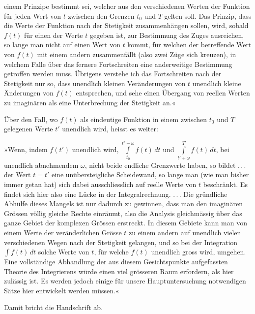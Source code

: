 \HistoricalFoot{}{26\textsuperscript{*}}
\clearpage{}
\noindent einem Prinzipe bestimmt sei, welcher aus den verschiedenen Werten der Funktion
für jeden Wert von \(t\) zwischen den Grenzen \(t_0\) und \(T\) gelten soll. Das
Prinzip, dass die Werte der Funktion nach der Stetigkeit zusammenhängen
sollen, wird, sobald \(f(t)\) für einen der Werte \(t\) gegeben ist, zur Bestimmung des
Zuges ausreichen, so lange man nicht auf einen Wert von \(t\) kommt, für
welchen der betreffende Wert von \(f(t)\) mit einem andern zusammenfällt (also
zwei Züge sich kreuzen), in welchem Falle über das fernere Fortschreiten eine
anderweitige Bestimmung getroffen werden muss. Übrigens verstehe ich das
Fortschreiten nach der Stetigkeit nur so, dass unendlich kleinen Veränderungen
von \(t\) unendlich kleine Änderungen von \(f(t)\) entsprechen, und sehe einen Übergang
von reellen Werten zu imaginären  als eine Unterbrechung der
Stetigkeit an.«
\par
Über den Fall, wo \(f(t)\) als eindeutige Funktion in einem zwischen \(t_0\) und
\(T\) gelegenen Werte \(t'\) unendlich wird, heisst es weiter:
\par
»Wenn, indem \(f(t')\) unendlich wird, \(\displaystyle\int\limits_{t_0}^{t'-\omega}f(t)\,dt\) und \(\displaystyle\int\limits_{t'+\omega}^T f(t)\,dt\), bei unendlich
abnehmendem \(\omega\), nicht beide endliche Grenzwerte haben, so bildet \mbox{.\,.\,.} der Wert
\(t=t'\) eine unübersteigliche Scheidewand, so lange man (wie man bisher immer
getan hat) sich dabei ausschliesslich auf reelle Werte von \(t\) beschränkt. Es
findet sich hier also eine Lücke in der Integralrechnung. \mbox{.\,.\,.} Die gründliche
Abhülfe dieses Mangels ist nur dadurch zu gewinnen, dass man den imaginären
Grössen völlig gleiche Rechte einräumt, also die Analysis gleichmässig
über das ganze Gebiet der komplexen Grössen erstreckt. In diesem Gebiete
kann man von einem Werte der veränderlichen Grösse \(t\) zu einem andern
auf unendlich vielen verschiedenen Wegen nach der Stetigkeit gelangen, und
so bei der Integration \(\int f(t)\,dt\) solche Werte von \(t\), für welche \(f(t)\) unendlich
gross wird, umgehen. Eine vollständige Abhandlung der aus diesem Gesichtspunkte
aufgefassten Theorie des Integrierens würde einen viel grösseren Raum
erfordern, als hier zulässig ist. Es werden jedoch einige für unsere Hauptuntersuchung
notwendigen Sätze hier entwickelt werden müssen.«
\par
Damit bricht die Handschrift ab.

